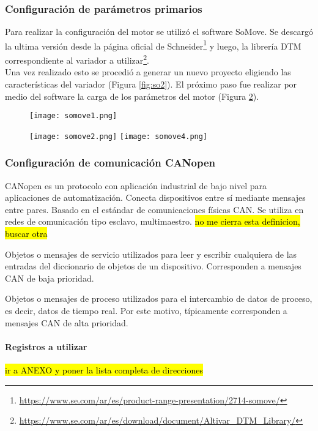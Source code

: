 \subsubsection{Configuración de parámetros primarios}
Para realizar la configuración del motor se utilizó el software SoMove. Se descargó la ultima versión desde la página oficial de Schneider\footnote{\url{https://www.se.com/ar/es/product-range-presentation/2714-somove/}} y luego, la librería DTM correspondiente al variador a utilizar\footnote{\url{https://www.se.com/ar/es/download/document/Altivar_DTM_Library/}}.
\\
Una vez realizado esto se procedió a generar un nuevo proyecto eligiendo las características del variador (Figura \ref{fig:so2}). El próximo paso fue realizar por medio del software la carga de los parámetros del motor (Figura \ref{fig:so4}).
\begin{figure}[h]
	\centering
	\texttt{[image: somove1.png]}
	\label{fig:so1}
\end{figure}
\begin{figure}[h]
	\centering
	\texttt{[image: somove2.png]}
	\label{fig:so2}
	\texttt{[image: somove4.png]}
	\label{fig:so4}
\end{figure}

\subsubsection{Configuración de comunicación CANopen}
\begin{tcolorbox}[colback=blue!5!white,colframe=blue!75!black,title=CANopen]
	CANopen es un protocolo con aplicación industrial de bajo nivel para aplicaciones de automatización. Conecta dispositivos entre sí mediante mensajes entre pares. Basado en el estándar de comunicaciones físicas CAN. Se utiliza en redes de comunicación tipo esclavo, multimaestro. \hl{no me cierra esta definicion, buscar otra}
\end{tcolorbox}

\begin{tcolorbox}[colback=blue!5!white,colframe=blue!75!black,title=SDO]
	Objetos o mensajes de servicio utilizados para leer y escribir cualquiera de las entradas del diccionario de objetos de un dispositivo.
	Corresponden a mensajes CAN de baja prioridad.
\end{tcolorbox}

\begin{tcolorbox}[colback=blue!5!white,colframe=blue!75!black,title=PDO]
	Objetos o mensajes de proceso utilizados para el
	intercambio de datos de proceso, es decir, datos de tiempo real. Por este motivo,
	típicamente corresponden a mensajes CAN de alta prioridad.
\end{tcolorbox}


\paragraph{Registros a utilizar}
\hl{ir a ANEXO y poner la lista completa de direcciones}

\newpage

